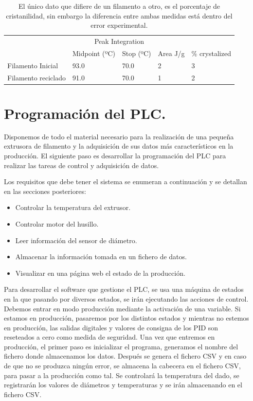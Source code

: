 \begin{table}[H]
    \centering
    \begin{tabular}{lllll}
        \multicolumn{5}{c}{Peak Integration}                                                                                 \\
                             & Midpoint (ºC) & Stop (ºC) & Area J/g   &  \% crystalized \\ \hline
        Filamento Inicial    & 93.0         & 70.0     & 2   &  3                         \\
        Filamento reciclado  & 91.0        & 70.0     & 1    & 2                        
    \end{tabular}
    \caption[Datos del DSC con la cristanilidad del filamento]{El único dato que difiere de un filamento a otro, es el porcentaje de cristanilidad, sin embargo la diferencia entre ambas medidas está dentro del error experimental.}
    \label{tab:dsc2}
\end{table}


\section{Programación del PLC.}

Disponemos de todo el material necesario para la realización de una pequeña extrusora de filamento y la adquisición de sus datos más característicos en la producción. El siguiente paso es desarrollar la programación del PLC para realizar las tareas de control y adquisición de datos.

Los requisitos que debe tener el sistema se enumeran a continuación y se detallan en las secciones posteriores:

\begin{itemize}
    \item{Controlar la temperatura del extrusor.}
    \item{Controlar motor del husillo.}
    \item{Leer información del sensor de diámetro.}
    \item{Almacenar la información tomada en un fichero de datos.}
    \item{Visualizar en una página web el estado de la producción.}
\end{itemize}

Para desarrollar el software que gestione el PLC, se usa una máquina de estados en la que pasando por diversos estados, se irán ejecutando las acciones de control. Debemos entrar en modo producción mediante la activación de una variable. Si estamos en producción, pasaremos por los distintos estados y mientras no estemos en producción, las salidas digitales y valores de consigna de los PID son reseteados a cero como medida de seguridad. Una vez que entremos en producción, el primer paso es inicializar el programa, generamos el nombre del fichero donde almacenamos los datos. Después se genera el fichero CSV y en caso de que no se produzca ningún error, se almacena la cabecera en el fichero CSV, para pasar a la producción como tal. Se controlará la temperatura del dado, se registrarán los valores de diámetros y temperaturas y se irán almacenando en el fichero CSV.\\

